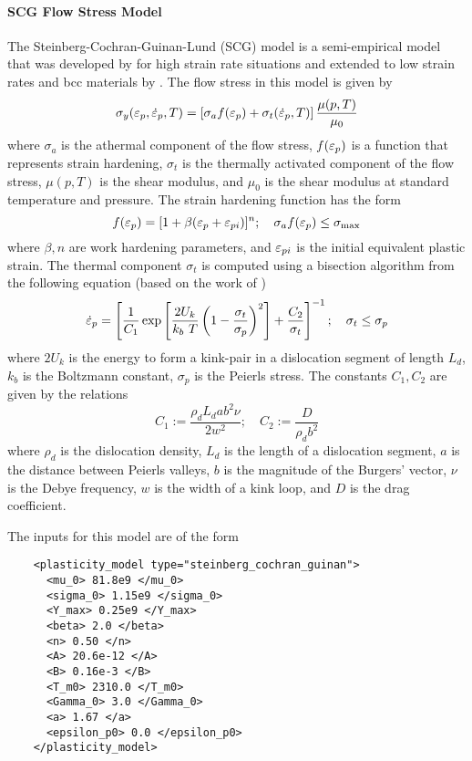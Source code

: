   \paragraph{SCG Flow Stress Model}
  The Steinberg-Cochran-Guinan-Lund (SCG) model is a semi-empirical model
  that was developed by \cite{Steinberg80} for high strain rate 
  situations and extended to low strain rates and bcc materials by
  \cite{Steinberg89}.  The flow stress in this model is given by
  \begin{equation}\label{eq:SCGL}
    \sigma_y(\Ep,\Epdot{},T) = 
     \left[\sigma_a f(\Ep) + \sigma_t (\Epdot{}, T)\right]
     \frac{\mu(p,T)}{\mu_0} 
  \end{equation}
  where $\sigma_a$ is the athermal component of the flow stress,
  $f(\Ep)$ is a function that represents strain hardening,
  $\sigma_t$ is the thermally activated component of the flow stress,
  $\mu(p,T)$ is the shear modulus, and $\mu_0$ is the shear modulus 
  at standard temperature and pressure.  The strain hardening function
  has the form
  \begin{equation}
    f(\Ep) = [1 + \beta(\Ep + \Epi)]^n ; \quad
    \sigma_a f(\Ep) \le \sigma_{\text{max}}
  \end{equation}
  where $\beta, n$ are work hardening parameters, and $\Epi$ is the 
  initial equivalent plastic strain.  The thermal component $\sigma_t$
  is computed using a bisection algorithm from the following equation (based 
  on the work of \cite{Hoge77})
  \begin{equation}
    \Epdot{} = \left[\frac{1}{C_1}\exp\left[\frac{2U_k}{k_b~T}
      \left(1 - \frac{\sigma_t}{\sigma_p}\right)^2\right] + 
      \frac{C_2}{\sigma_t}\right]^{-1}; \quad
    \sigma_t \le \sigma_p
  \end{equation}
  where $2 U_k$ is the energy to form a kink-pair in a dislocation segment
  of length $L_d$, $k_b$ is the Boltzmann constant, $\sigma_p$ is the Peierls
  stress. The constants $C_1, C_2$ are given by the relations
  \begin{equation}
    C_1 := \frac{\rho_d L_d a b^2 \nu}{2 w^2}; \quad
    C_2 := \frac{D}{\rho_d b^2}
  \end{equation}
  where $\rho_d$ is the dislocation density, $L_d$ is the length of a 
  dislocation segment, $a$ is the distance between Peierls valleys, 
  $b$ is the magnitude of the Burgers' vector, $\nu$ is the Debye frequency,
  $w$ is the width of a kink loop, and $D$ is the drag coefficient.

  The inputs for this model are of the form
  \begin{verbatim}
    <plasticity_model type="steinberg_cochran_guinan">
      <mu_0> 81.8e9 </mu_0>
      <sigma_0> 1.15e9 </sigma_0>
      <Y_max> 0.25e9 </Y_max>
      <beta> 2.0 </beta>
      <n> 0.50 </n>
      <A> 20.6e-12 </A>
      <B> 0.16e-3 </B>
      <T_m0> 2310.0 </T_m0>
      <Gamma_0> 3.0 </Gamma_0>
      <a> 1.67 </a>
      <epsilon_p0> 0.0 </epsilon_p0>
    </plasticity_model>
  \end{verbatim}

